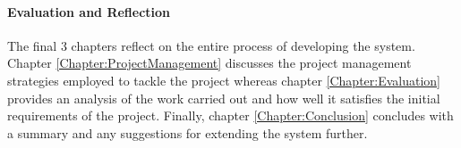 \paragraph{Evaluation and Reflection}
The final 3 chapters reflect on the entire process of developing the system. Chapter \ref{Chapter:ProjectManagement} discusses the project management strategies employed to tackle the project whereas chapter \ref{Chapter:Evaluation} provides an analysis of the work carried out and how well it satisfies the initial requirements of the project. Finally, chapter \ref{Chapter:Conclusion} concludes with a summary and any suggestions for extending the system further.
